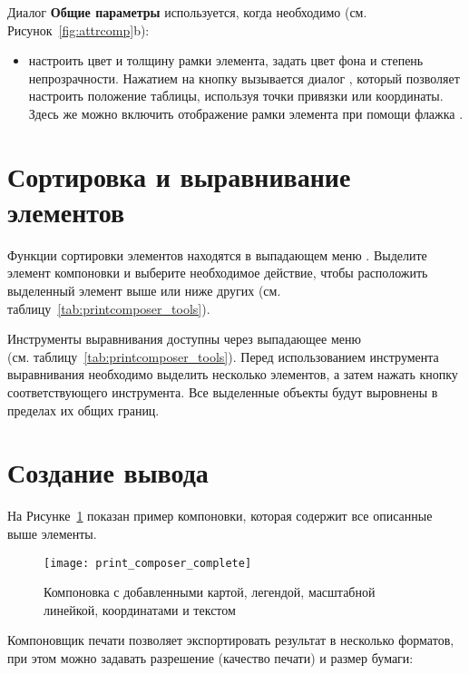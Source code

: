 
Диалог \textbf{Общие параметры} используется, когда необходимо
(см. Рисунок~\ref{fig:attrcomp}b):

\begin{itemize}[label=--]
\item настроить цвет и толщину рамки элемента, задать
цвет фона и степень непрозрачности. Нажатием на кнопку 
вызывается диалог , который позволяет
настроить положение таблицы, используя точки привязки или координаты.
Здесь же можно включить отображение рамки элемента при помощи флажка
.
\end{itemize}

\section{Сортировка и выравнивание элементов}

Функции сортировки элементов находятся в выпадающем меню
. Выделите
элемент компоновки и выберите необходимое действие, чтобы расположить
выделенный элемент выше или ниже других (см. таблицу~\ref{tab:printcomposer_tools}).

Инструменты выравнивания доступны через выпадающее меню \\
(см. таблицу~\ref{tab:printcomposer_tools}). Перед использованием
инструмента выравнивания необходимо выделить несколько элементов, а
затем нажать кнопку соответствующего инструмента. Все выделенные объекты
будут выровнены в пределах их общих границ.

\section{Создание вывода}

На Рисунке~\ref{fig:print_composer_complete} показан пример компоновки,
которая содержит все описанные выше элементы.

\begin{figure}[h]
   \centering
   \texttt{[image: print\_composer\_complete]}
   \caption{Компоновка с добавленными картой, легендой, масштабной линейкой, координатами и текстом \wincaption} \label{fig:print_composer_complete}
\end{figure}

Компоновщик печати позволяет экспортировать результат в несколько
форматов, при этом можно задавать разрешение (качество печати) и размер
бумаги:

